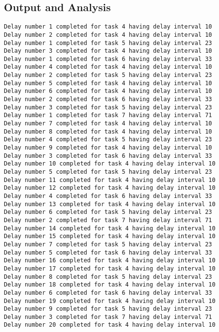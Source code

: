\documentclass{article}
\begin{document}
\subsection{Output and Analysis}
\begin{verbatim}
Delay number 1 completed for task 4 having delay interval 10
Delay number 2 completed for task 4 having delay interval 10
Delay number 1 completed for task 5 having delay interval 23
Delay number 3 completed for task 4 having delay interval 10
Delay number 1 completed for task 6 having delay interval 33
Delay number 4 completed for task 4 having delay interval 10
Delay number 2 completed for task 5 having delay interval 23
Delay number 5 completed for task 4 having delay interval 10
Delay number 6 completed for task 4 having delay interval 10
Delay number 2 completed for task 6 having delay interval 33
Delay number 3 completed for task 5 having delay interval 23
Delay number 1 completed for task 7 having delay interval 71
Delay number 7 completed for task 4 having delay interval 10
Delay number 8 completed for task 4 having delay interval 10
Delay number 4 completed for task 5 having delay interval 23
Delay number 9 completed for task 4 having delay interval 10
Delay number 3 completed for task 6 having delay interval 33
Delay number 10 completed for task 4 having delay interval 10
Delay number 5 completed for task 5 having delay interval 23
Delay number 11 completed for task 4 having delay interval 10
Delay number 12 completed for task 4 having delay interval 10
Delay number 4 completed for task 6 having delay interval 33
Delay number 13 completed for task 4 having delay interval 10
Delay number 6 completed for task 5 having delay interval 23
Delay number 2 completed for task 7 having delay interval 71
Delay number 14 completed for task 4 having delay interval 10
Delay number 15 completed for task 4 having delay interval 10
Delay number 7 completed for task 5 having delay interval 23
Delay number 5 completed for task 6 having delay interval 33
Delay number 16 completed for task 4 having delay interval 10
Delay number 17 completed for task 4 having delay interval 10
Delay number 8 completed for task 5 having delay interval 23
Delay number 18 completed for task 4 having delay interval 10
Delay number 6 completed for task 6 having delay interval 33
Delay number 19 completed for task 4 having delay interval 10
Delay number 9 completed for task 5 having delay interval 23
Delay number 3 completed for task 7 having delay interval 71
Delay number 20 completed for task 4 having delay interval 10
\end{verbatim}
\end{document}
